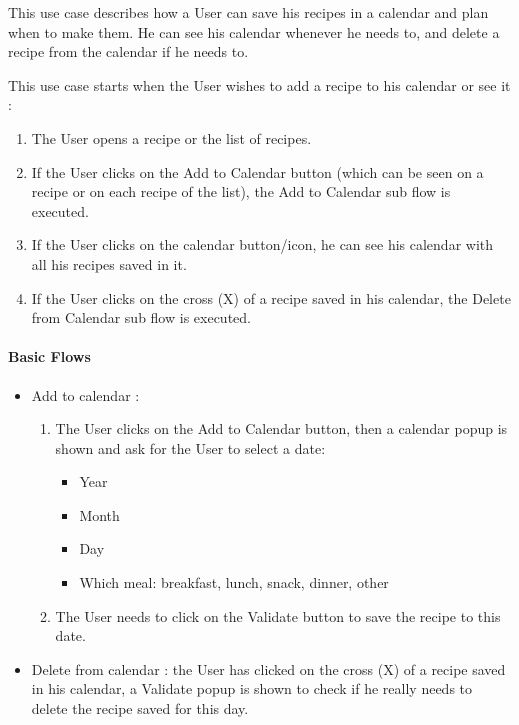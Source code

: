 {
  This use case describes how a User can save his recipes in a calendar and plan when to make them. He can see his calendar whenever he needs to, and delete a recipe from the calendar if he needs to.

}
{
  This use case starts when the User wishes to add a recipe to his calendar or see it :
  \begin{enumerate}
    \item The User opens a recipe or the list of recipes.
    \item If the User clicks on the Add to Calendar button (which can be seen on a recipe or on each recipe of the list), the Add to Calendar sub flow is executed.
    \item If the User clicks on the calendar button/icon, he can see his calendar with all his recipes saved in it.
    \item If the User clicks on the cross (X) of a recipe saved in his calendar, the Delete from Calendar sub flow is executed.
  \end{enumerate}

  \paragraph{Basic Flows}
  \begin{itemize}
    \item Add to calendar :
    \begin{enumerate}
      \item The User clicks on the Add to Calendar button, then a calendar popup is shown and ask for the User to select a date:
      \begin{itemize}
        \item Year
        \item Month
        \item Day
        \item Which meal: breakfast, lunch, snack, dinner, other
      \end{itemize}
      \item The User needs to click on the Validate button to save the recipe to this date.
    \end{enumerate}
    \item Delete from calendar : the User has clicked on the cross (X) of a recipe saved in his calendar, a Validate popup is shown to check if he really needs to delete the recipe saved for this day.
  \end{itemize}

}
